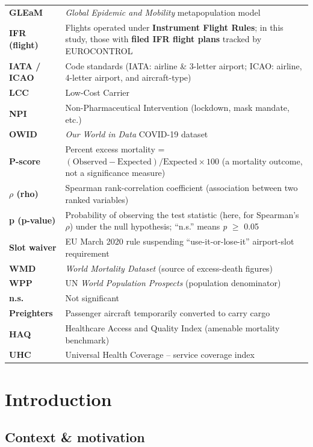 \documentclass[
  authoryear,
  preprint,
  3p,
  onecolumn]{elsarticle}
\begin{document}
\begin{longtable}[]{@{}
  >{\raggedright\arraybackslash}p{}
  >{\raggedright\arraybackslash}p{}@{}}
\textbf{GLEaM} & \emph{Global Epidemic and Mobility} metapopulation
model \\
\textbf{IFR (flight)} & Flights operated under \textbf{Instrument Flight
Rules}; in this study, those with \textbf{filed IFR flight plans}
tracked by EUROCONTROL \\
\textbf{IATA / ICAO} & Code standards (IATA: airline \& 3-letter
airport; ICAO: airline, 4-letter airport, and aircraft-type) \\
\textbf{LCC} & Low-Cost Carrier \\
\textbf{NPI} & Non-Pharmaceutical Intervention (lockdown, mask mandate,
etc.) \\
\textbf{OWID} & \emph{Our World in Data} COVID-19 dataset \\
\textbf{P-score} & Percent excess mortality =
\((\text{Observed} - \text{Expected})/\text{Expected} \times 100\) (a
mortality outcome, not a significance measure) \\
\textbf{\(\rho\) (rho)} & Spearman rank-correlation coefficient
(association between two ranked variables) \\
\textbf{p (p-value)} & Probability of observing the test statistic
(here, for Spearman's \(\rho\)) under the null hypothesis; ``n.s.''
means \emph{p} \(\ge\) 0.05 \\
\textbf{Slot waiver} & EU March 2020 rule suspending
``use-it-or-lose-it'' airport-slot requirement \\
\textbf{WMD} & \emph{World Mortality Dataset} (source of excess-death
figures) \\
\textbf{WPP} & UN \emph{World Population Prospects} (population
denominator) \\
\textbf{n.s.} & Not significant \\
\textbf{Preighters} & Passenger aircraft temporarily converted to carry
cargo \\
\textbf{HAQ} & Healthcare Access and Quality Index (amenable mortality
benchmark) \\
\textbf{UHC} & Universal Health Coverage -- service coverage index \\
\end{longtable}

\section{Introduction}\label{introduction}

\subsection{Context \& motivation}\label{context-motivation}
\end{document}

